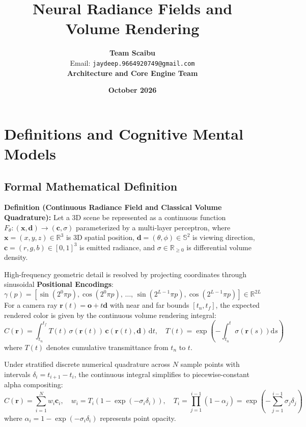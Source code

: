 \documentclass[11pt,a4paper]{article}
\title{\textbf{Neural Radiance Fields and Volume Rendering}}
\author{\textbf{Team Scaibu} \\ \small Email: \texttt{jaydeep.9664920749@gmail.com} \\ \small \textbf{Architecture and Core Engine Team}}
\date{\textbf{October 2026}}
\theoremstyle{definition}
\begin{document}
\maketitle

\section{Definitions and Cognitive Mental Models}

\subsection{Formal Mathematical Definition}
\textbf{Definition (Continuous Radiance Field and Classical Volume Quadrature):}
Let a 3D scene be represented as a continuous function $F_\theta: (\mathbf{x}, \mathbf{d}) \to (\mathbf{c}, \sigma)$ parameterized by a multi-layer perceptron, where $\mathbf{x} = (x, y, z) \in \mathbb{R}^3$ is 3D spatial position, $\mathbf{d} = (\theta, \phi) \in \mathbb{S}^2$ is viewing direction, $\mathbf{c} = (r, g, b) \in [0, 1]^3$ is emitted radiance, and $\sigma \in \mathbb{R}_{\ge 0}$ is differential volume density.

High-frequency geometric detail is resolved by projecting coordinates through sinusoidal \textbf{Positional Encodings}:
{\boldmath
\begin{equation}
\gamma(p) = \left[ \sin(2^0 \pi p), \cos(2^0 \pi p), \, \dots, \, \sin(2^{L-1} \pi p), \cos(2^{L-1} \pi p) \right] \in \mathbb{R}^{2L}
\end{equation}
}
For a camera ray $\mathbf{r}(t) = \mathbf{o} + t \mathbf{d}$ with near and far bounds $[t_n, t_f]$, the expected rendered color is given by the continuous volume rendering integral:
{\boldmath
\begin{equation}
C(\mathbf{r}) = \int_{t_n}^{t_f} T(t) \, \sigma(\mathbf{r}(t)) \, \mathbf{c}(\mathbf{r}(t), \mathbf{d}) \, \mathrm{d}t, \quad T(t) = \exp\left( -\int_{t_n}^t \sigma(\mathbf{r}(s)) \mathrm{d}s \right)
\end{equation}
}
where $T(t)$ denotes cumulative transmittance from $t_n$ to $t$.

Under stratified discrete numerical quadrature across $N$ sample points with intervals $\delta_i = t_{i+1} - t_i$, the continuous integral simplifies to piecewise-constant alpha compositing:
{\boldmath
\begin{equation}
\hat{C}(\mathbf{r}) = \sum_{i=1}^N w_i \mathbf{c}_i, \quad w_i = T_i \left( 1 - \exp(-\sigma_i \delta_i) \right), \quad T_i = \prod_{j=1}^{i-1} \left( 1 - \alpha_j \right) = \exp\left( -\sum_{j=1}^{i-1} \sigma_j \delta_j \right)
\end{equation}
}
where $\alpha_i = 1 - \exp(-\sigma_i \delta_i)$ represents point opacity.
\end{document}
